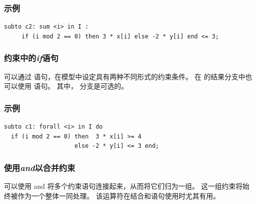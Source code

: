 \subsubsection{示例}
{\small
\begin{verbatim}
subto c2: sum <i> in I :
     if (i mod 2 == 0) then 3 * x[i] else -2 * y[i] end <= 3;
\end{verbatim}
}

\subsubsection{约束中的\emph{if}语句}
可以通过  语句，在模型中设定具有两种不同形式的约束条件。
在  的结果分支中也可以使用  语句。
其中， 分支是可选的。

\subsubsection{示例}
{\small
\begin{verbatim}
subto c1: forall <i> in I do
  if (i mod 2 == 0) then  3 * x[i] >= 4
                    else -2 * y[i] <= 3 end;
\end{verbatim}
}

\subsubsection{使用\emph{and}以合并约束}
可以使用 and 将多个约束语句连接起来，从而将它们归为一组。
这一组约束将始终被作为一个整体一同处理。
该运算符在结合和语句使用时尤其有用。


